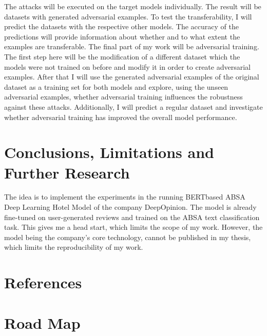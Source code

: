The attacks will be executed on the target models individually.
The result will be datasets with generated adversarial examples. To test the transferability, I will predict the datasets with the respective other models. The accuracy of the predictions will provide information about whether and to what extent the examples are transferable.
The final part of my work will be adversarial training. 
The first step here will be the modification of a different dataset which the models were not trained on before and modify it in order to create adversarial examples. After that I will use the generated adversarial examples of the original dataset as a training set for both models and explore, using the unseen adversarial examples, whether adversarial training influences the robustness against these attacks. Additionally, I will predict a regular dataset and investigate whether adversarial training has improved the overall model performance.

\section{Conclusions, Limitations and Further Research}

The idea is to implement the experiments in the running BERTbased ABSA Deep Learning Hotel Model of the company DeepOpinion. The model is already fine-tuned on user-generated reviews and trained on the ABSA text classification task. This gives me a head start, which limits the scope of my work. However, the model being the company's core technology, cannot be published in my thesis, which limits the reproducibility of my work.

\section{References}


\section*{Road Map}

